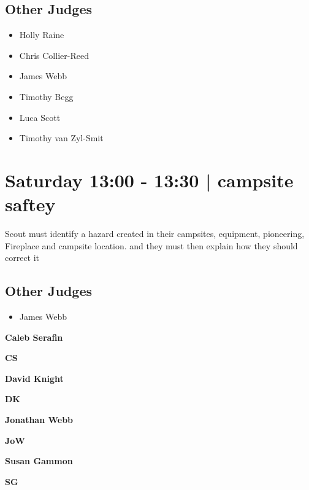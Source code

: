 \documentclass[10pt, A5]{article}
\newcommand{\newtitle}[1]{\begin{center}{\Huge\bfseries #1 }\\ \vspace{5mm}\end{center}}
\newcommand{\newsubtitle}[1]{\begin{center}{\color{grey}\Large\bfseries #1 }\\ \vspace{5mm}\end{center}}
\begin{document}
        \subsection*{Other Judges}
        
            \begin{itemize}
                            \item Holly Raine
                            \item Chris Collier-Reed
                            \item James Webb
                            \item Timothy Begg
                            \item Luca Scott
                            \item Timothy van Zyl-Smit
                        \end{itemize}
        

            \section*{Saturday 13:00
        -
        13:30
        |
         campsite saftey}
        
                            Scout must identify a hazard created in their campsites, equipment, pioneering, Fireplace and campsite location. and they must then explain how they should correct it
        
        \subsection*{Other Judges}
        
            \begin{itemize}
                            \item James Webb
                        \end{itemize}
        

    
	\clearpage

		\newtitle{Caleb Serafin}
	\newsubtitle{CS}

    
	\clearpage

		\newtitle{David Knight}
	\newsubtitle{DK}

    
	\clearpage

		\newtitle{Jonathan Webb}
	\newsubtitle{JoW}

    
	\clearpage

		\newtitle{Susan Gammon}
	\newsubtitle{SG}
\end{document}
